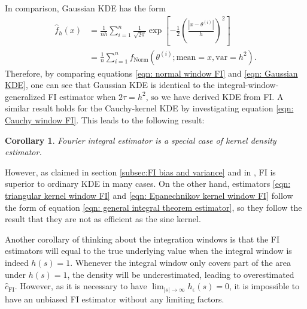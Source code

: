 \documentclass[%
 reprint,
 amsmath,amssymb,
 aps,
]{revtex4-2}
\newtheorem{corollary}[theorem]{Corollary}
\begin{document}
In comparison, Gaussian KDE has the form
\begin{align} \label{eqn: Gaussian KDE}
    \hat{f}_h(x) & = \frac{1}{nh}\sum_{i = 1}^n \frac{1}{\sqrt{2\pi}}\exp\left[-\frac{1}{2}\left(\frac{|x - \theta^{(i)}|}{h} \right)^2 \right] \\
    & = \frac{1}{n}\sum_{i = 1}^n f_\text{Norm}(\theta^{(i)}; \text{mean} = x, \text{var} = h^2).
\end{align}
Therefore, by comparing equations \eqref{eqn: normal window FI} and \eqref{eqn: Gaussian KDE}, one can see that Gaussian KDE is identical to the integral-window-generalized FI estimator when $2\tau = h^2$, so we have derived KDE from FI. A similar result holds for the Cauchy-kernel KDE by investigating equation \eqref{eqn: Cauchy window FI}. This leads to the following result:

\begin{corollary}
Fourier integral estimator is a special case of kernel density estimator.    
\end{corollary}

However, as claimed in section \ref{subsec:FI bias and variance} and in \cite{rotiroti2022computing}, FI is superior to ordinary KDE in many cases. On the other hand, estimators \eqref{eqn: triangular kernel window FI} and \eqref{eqn: Epanechnikov kernel window FI} follow the form of equation \eqref{eqn: general integral theorem estimator}, so they follow the result \cite{ho2021integral} that they are not as efficient as the sine kernel.

Another corollary of thinking about the integration windows is that the FI estimators will equal to the true underlying value when the integral window is indeed $h(s) = 1$. Whenever the integral window only covers part of the area under $h(s) = 1$, the density will be underestimated, leading to overestimated $\hat{c}_\text{FI}$. However, as it is necessary to have $\displaystyle\lim_{|s| \to \infty} h_\epsilon(s) = 0$, it is impossible to have an unbiased FI estimator without any limiting factors.
\end{document}
